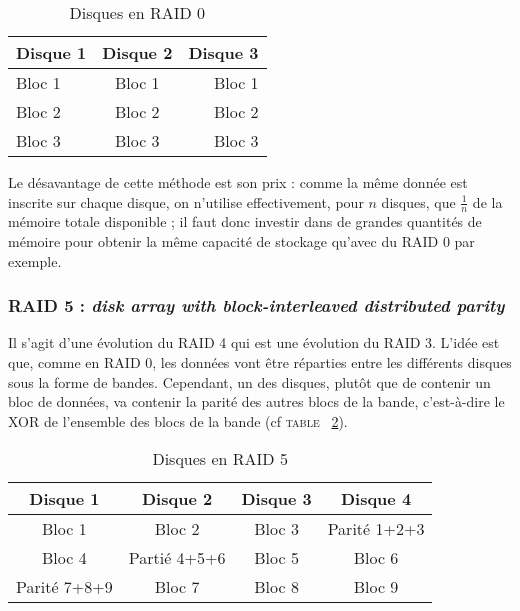 \begin{table}[h]
    \centering
    \caption{\label{striping} Disques en RAID 0}
    \begin{tabular}{|l|c|r|}
        \hline
        \textbf{Disque 1} & \textbf{Disque 2} & \textbf{Disque 3} \\
        \hline
        Bloc 1 & Bloc 1 & Bloc 1 \\
        \hline
        Bloc 2 & Bloc 2 & Bloc 2 \\
        \hline
        Bloc 3 & Bloc 3 & Bloc 3 \\
        \hline
    \end{tabular}
\end{table}

Le désavantage de cette méthode est son prix : comme la même donnée est inscrite sur chaque disque, on n'utilise effectivement, pour $n$ disques, que $\frac{1}{n}$ de la mémoire totale disponible ; il faut donc investir dans de grandes quantités de mémoire pour obtenir la même capacité de stockage qu'avec du RAID 0 par exemple.

\subsubsection{RAID 5 : \textit{disk array with block-interleaved distributed parity}}
Il s'agit d'une évolution du RAID 4 qui est une évolution du RAID 3. L'idée est que, comme en RAID 0, les données vont être réparties entre les différents disques sous la forme de bandes. Cependant, un des disques, plutôt que de contenir un bloc de données, va contenir la parité des autres blocs de la bande, c'est-à-dire le XOR de l'ensemble des blocs de la bande (cf \textsc{table ~\ref{raid5}}). 

\begin{table}[h]
    \centering
    \caption{\label{raid5} Disques en RAID 5}
    \begin{tabular}{|c|c|c|c|}
        \hline
        \textbf{Disque 1} & \textbf{Disque 2} & \textbf{Disque 3} & \textbf{Disque 4}\\
        \hline
        Bloc 1 & Bloc 2 & Bloc 3 & Parité 1+2+3 \\
        \hline
        Bloc 4 & Partié 4+5+6 & Bloc 5 & Bloc 6 \\
        \hline
        Parité 7+8+9 & Bloc 7 & Bloc 8 & Bloc 9 \\
        \hline
    \end{tabular}
\end{table}

